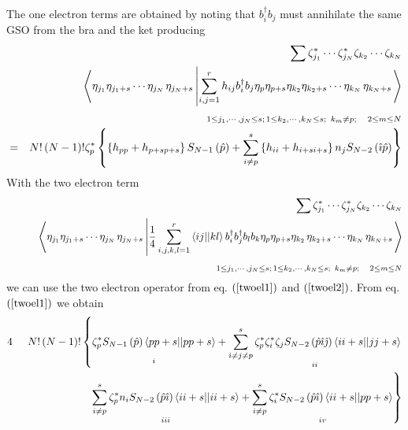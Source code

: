 \documentclass{article}
\begin{document}
The one electron terms are obtained by noting that $b_{i}^{\dagger }b_{j}$
must annihilate the same GSO from the bra and the ket producing 
\begin{eqnarray}
&&\sum \zeta _{j_{1}}^{\ast }\cdots \zeta _{j_{N}}^{\ast }\zeta
_{k_{2}}\cdots \zeta _{k_{N}}  \notag \\
&&\qquad \left\langle \eta _{j_{1}}\eta _{j_{1}+s}\cdots \eta _{j_{N}\,}\eta
_{j_{N}+s}\left| \sum_{i,j=1}^{r}h_{ij}b_{i}^{\dagger }b_{j}\eta _{p}\eta
_{p+s}\eta _{k_{2}}\eta _{k_{2}+s}\cdots \eta _{k_{N}\,}\eta
_{k_{N}+s}\right. \right\rangle  \notag \\
&&\qquad \qquad \qquad \qquad \qquad \qquad \qquad \qquad _{1\leq
j_{1},\cdots ,j_{N}\leq s;\,1\leq k_{2},\cdots ,k_{N}\leq s;\,\,\,k_{m}\neq
p;\quad 2\leq m\leq N}  \notag \\
&=&N!\left( N-1\right) !\zeta _{p}^{\ast }\left\{ \left\{
h_{pp}+h_{p+sp+s}\right\} S_{N-1}\left( \hat{p}\right) +\sum_{i\neq
p}^{s}\left\{ h_{ii}+h_{i+si+s}\right\} n_{j}S_{N-2}\left( \hat{\imath}\hat{p%
}\right) \right\}
\end{eqnarray}%
With the two electron term 
\begin{eqnarray}
&&\sum \zeta _{j_{1}}^{\ast }\cdots \zeta _{j_{N}}^{\ast }\zeta
_{k_{2}}\cdots \zeta _{k_{N}}  \notag \\
&&\qquad \left\langle \eta _{j_{1}}\eta _{j_{1}+s}\cdots \eta _{j_{N}\,}\eta
_{j_{N}+s}\left| \frac{1}{4}\sum_{i,j,k,l=1}^{r}\left\langle
ij||kl\right\rangle b_{i}^{\dagger }b_{j}^{\dagger }b_{l}b_{k}\eta _{p}\eta
_{p+s}\eta _{k_{2}\,}\eta _{k_{2}+s}\cdots \eta _{k_{N}\,}\eta
_{k_{N}+s}\right. \right\rangle  \notag \\
&&\qquad \qquad \qquad \qquad \qquad \qquad \qquad \qquad _{1\leq
j_{1},\cdots ,j_{N}\leq s;\,1\leq k_{2},\cdots ,k_{N}\leq s;\,\,\,k_{m}\neq
p;\quad 2\leq m\leq N}
\end{eqnarray}%
we can use the two electron operator from eq. $\left( \ref{twoel1}\right) $
and $\left( \ref{twoel2}\right) $. From eq. $\left( \ref{twoel1}\right) $ we
obtain 
\begin{eqnarray}
4 &&N!\left( N-1\right) !\left\{ \underset{i}{\underset{}{\zeta _{p}^{\ast
}S_{N-1}\left( \hat{p}\right) \left\langle pp+s||pp+s\right\rangle }}+%
\underset{ii}{\sum_{i\neq j\neq p}^{s}\zeta _{p}^{\ast }\zeta _{i}^{\ast
}\zeta _{j}S_{N-2}\left( \hat{p}\hat{\imath}\hat{\jmath}\right) \left\langle
ii+s||jj+s\right\rangle }\right.  \notag \\
&&\left. {}\right. \qquad \qquad \qquad \left. \underset{iii}{\sum_{i\neq
p}^{s}\zeta _{p}^{\ast }n_{i}S_{N-2}\left( \hat{p}\hat{\imath}\right)
\left\langle ii+s||ii+s\right\rangle }+\underset{iv}{\sum_{i\neq p}^{s}\zeta
_{i}^{\ast }S_{N-2}\left( \hat{p}\hat{\imath}\right) \left\langle
ii+s||pp+s\right\rangle }\right\}
\end{eqnarray}%
\end{document}
